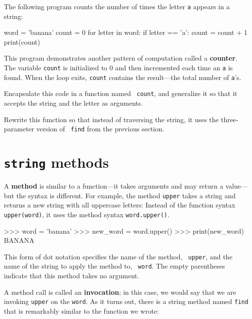 The following program counts the number of times the letter {\tt a}
appears in a string:

\beforeverb
\begin{pycode}
word = 'banana'
count = 0
for letter in word:
    if letter == 'a':
        count = count + 1
print(count)
\end{pycode}
\afterverb
%
This program demonstrates another pattern of computation called a {\bf
counter}.  The variable {\tt count} is initialized to 0 and then
incremented each time an {\tt a} is found.
When the loop exits, {\tt count}
contains the result---the total number of {\tt a}'s.

\begin{exercise}

Encapsulate this code in a function named {\tt
count}, and generalize it so that it accepts the string and the
letter as arguments.
\end{exercise}

\begin{exercise}
Rewrite this function so that instead of
traversing the string, it uses the three-parameter version of {\tt
find} from the previous section.
\end{exercise}


\section{{\tt string} methods}

A {\bf method} is similar to a function---it takes arguments and
may return a value---but the syntax is different.  For example, the
method {\tt upper} takes a string and returns a new string with
all uppercase letters:
%
%
Instead of the function syntax {\tt upper(word)}, it uses
the method syntax {\tt word.upper()}.


\beforeverb
\begin{pycode}
>>> word = 'banana'
>>> new_word = word.upper()
>>> print(new_word)
BANANA
\end{pycode}
\afterverb
%
This form of dot notation specifies the name of the method, {\tt
upper}, and the name of the string to apply the method to, {\tt
word}.  The empty parentheses indicate that this method takes no
argument.


A method call is called an {\bf invocation}; in this case, we would
say that we are invoking {\tt upper} on the {\tt word}.
%
%
As it turns out, there is a string method named {\tt find} that
is remarkably similar to the function we wrote:

